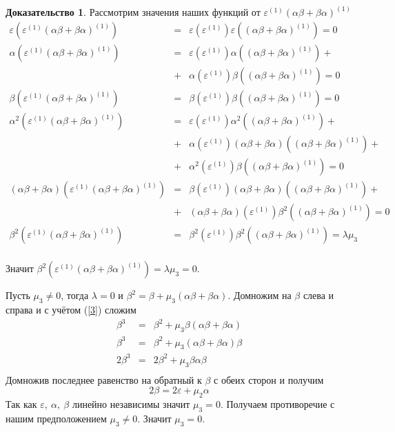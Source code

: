 \documentclass[a4paper, 12pt]{article}
\theoremstyle{definition}
\newtheorem*{prof}{\hspace*{\parindent}Доказательство}
\begin{document}
\begin{prof}
    Рассмотрим значения наших функций от $\varepsilon^{(1)}(\alpha\beta+\beta\alpha)^{(1)}$
    \begin{eqnarray*}
    \varepsilon\left(\varepsilon^{(1)}(\alpha\beta+\beta\alpha)^{(1)}\right) &=& 
    \varepsilon\left(\varepsilon^{(1)}\right)\varepsilon\left((\alpha\beta+\beta\alpha)^{(1)}\right) = 0\\
    \alpha\left(\varepsilon^{(1)}(\alpha\beta+\beta\alpha)^{(1)}\right) &=&
    \varepsilon\left(\varepsilon^{(1)}\right)\alpha\left((\alpha\beta+\beta\alpha)^{(1)}\right)+\\
    &+&\alpha\left(\varepsilon^{(1)}\right)\beta\left((\alpha\beta+\beta\alpha)^{(1)}\right) = 0\\
    \beta\left(\varepsilon^{(1)}(\alpha\beta+\beta\alpha)^{(1)}\right) &=&
    \beta\left(\varepsilon^{(1)}\right)\beta\left((\alpha\beta+\beta\alpha)^{(1)}\right) = 0\\
    \alpha^2\left(\varepsilon^{(1)}(\alpha\beta+\beta\alpha)^{(1)}\right) &=&
    \varepsilon\left(\varepsilon^{(1)}\right)\alpha^2\left((\alpha\beta+\beta\alpha)^{(1)}\right)+\\
    &+&
    \alpha\left(\varepsilon^{(1)}\right)(\alpha\beta+\beta\alpha)\left((\alpha\beta+\beta\alpha)^{(1)}\right)+\\
    &+& \alpha^2\left(\varepsilon^{(1)}\right)\beta\left((\alpha\beta+\beta\alpha)^{(1)}\right) = 0\\
    (\alpha\beta+\beta\alpha)\left(\varepsilon^{(1)}(\alpha\beta+\beta\alpha)^{(1)}\right) &=&
    \beta\left(\varepsilon^{(1)}\right)(\alpha\beta+\beta\alpha)\left((\alpha\beta+\beta\alpha)^{(1)}\right)+\\
    &+&(\alpha\beta+\beta\alpha)\left(\varepsilon^{(1)}\right)\beta^2\left((\alpha\beta+\beta\alpha)^{(1)}\right) = 0\\
    \beta^2\left(\varepsilon^{(1)}(\alpha\beta+\beta\alpha)^{(1)}\right) &=& \beta^2\left(\varepsilon^{(1)}\right)\beta^2\left((\alpha\beta+\beta\alpha)^{(1)}\right) = \lambda\mu_3\\
    \end{eqnarray*}

    Значит $\beta^2\left(\varepsilon^{(1)}(\alpha\beta+\beta\alpha)^{(1)}\right) = \lambda\mu_3 = 0$.

    Пусть $\mu_3 \neq 0$, тогда $\lambda = 0$ и $\beta^2 = \beta + \mu_3(\alpha\beta+\beta\alpha)$.
    Домножим на $\beta$ слева и справа и с учётом (\ref{3}) сложим 
    \begin{eqnarray*}
        \beta^3 &=& \beta^2 + \mu_3 \beta(\alpha\beta+\beta\alpha)\\
        \beta^3 &=& \beta^2 + \mu_3 (\alpha\beta+\beta\alpha)\beta\\
        2\beta^3 &=& 2\beta^2 + \mu_3 \beta\alpha\beta\\
    \end{eqnarray*}
    Домножив последнее равенство на обратный к $\beta$ с обеих сторон и получим
    \[
    2\beta = 2\varepsilon+\mu_2\alpha
    \]
    Так как $\varepsilon,\ \alpha,\ \beta$ линейно независимы значит $\mu_3 = 0$. Получаем противоречие с нашим предположением $\mu_3 \neq 0$. Значит $\mu_3 = 0$.


\end{prof}
\end{document}
